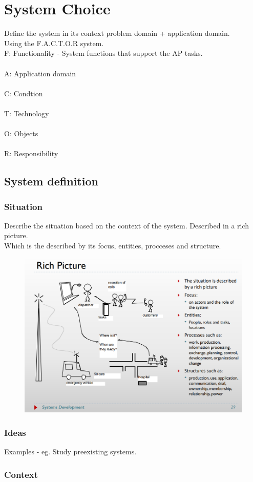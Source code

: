 \chapter{System Choice}
Define the system in its context problem domain + application domain.\\
Using the F.A.C.T.O.R system.\\
F: Functionality - System functions that support the AP tasks.
\\\\
A: Application domain
\\\\
C: Condtion
\\\\
T: Technology
\\\\
O: Objects
\\\\
R: Responsibility

\section*{System definition}
\subsection*{Situation}
Describe the situation based on the context of the system. Described in a rich picture.\\
Which is the described by its focus, entities, procceses and structure.

\begin{figure}[h]
    \centering
    \includegraphics*[width=\linewidth]{chapters/system_choice/figure/rich_picture.png}
\end{figure}
\subsection*{Ideas}
Examples - eg. Study preexisting systems.

\subsection*{Context}